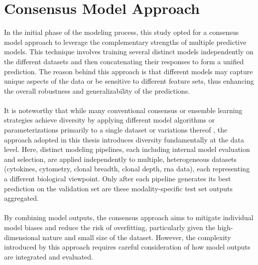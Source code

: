 \documentclass[12pt,a4paper]{report}
\begin{document}
\section{Consensus Model Approach}
\label{sec:consensus_model_approach}
\noindent
In the initial phase of the modeling process, this study opted for a consensus model approach to leverage the complementary strengths of multiple predictive models. This technique involves training several distinct models independently on the different datasets and then concatenating their responses to form a unified prediction. The reason behind this approach is that different models may capture unique aspects of the data or be sensitive to different feature sets, thus enhancing the overall robustness and generalizability of the predictions.\\
\\
It is noteworthy that while many conventional consensus or ensemble learning strategies achieve diversity by applying different model algorithms or parameterizations primarily to a single dataset or variations thereof \cite{Rokach2010}, the approach adopted in this thesis introduces diversity fundamentally at the data level. Here, distinct modeling pipelines, each including internal model evaluation and selection, are applied independently to multiple, heterogeneous datasets (cytokines, cytometry, clonal breadth, clonal depth, \acrshort{rna} data), each representing a different biological viewpoint. Only after each pipeline generates its best prediction on the validation set are these modality-specific test set outputs aggregated.\\
\\
By combining model outputs, the consensus approach aims to mitigate individual model biases and reduce the risk of overfitting, particularly given the high-dimensional nature and small size of the dataset. However, the complexity introduced by this approach requires careful consideration of how model outputs are integrated and evaluated.
\end{document}

